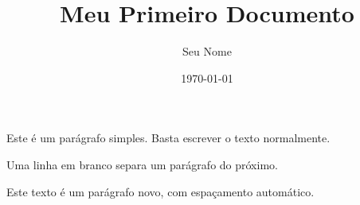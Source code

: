 \documentclass[12pt, a4paper]{article}   %
\title{Meu Primeiro Documento}
\author{Seu Nome}
\date{\today}
\begin{document}
\maketitle                               %

Este é um parágrafo simples. Basta escrever o texto normalmente.

Uma linha em branco separa um parágrafo do próximo.

Este texto é um parágrafo novo, com espaçamento automático.
\end{document}

